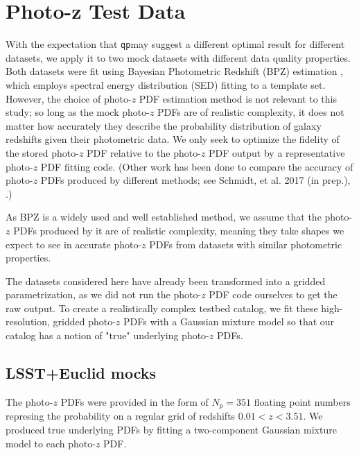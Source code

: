 \documentclass[\docopts]{\docclass}
\newcommand{\qp}{\texttt{qp}}
\begin{document}
\section{Photo-z Test Data}
\label{sec:data}

With the expectation that \qp may suggest a different optimal result for 
different datasets, we apply it to two mock datasets with different data 
quality properties.  Both datasets were fit using Bayesian Photometric Redshift 
(BPZ) estimation \citep{benitez_bayesian_2000}, which employs spectral energy 
distribution (SED) fitting to a template set.  However, the choice of photo-$z$ 
PDF estimation method is not relevant to this study; so long as the mock 
photo-$z$ PDFs are of realistic complexity, it does not matter how accurately 
they describe the probability distribution of galaxy redshifts given their 
photometric data.  We only seek to optimize the fidelity of the stored 
photo-$z$ PDF relative to the photo-$z$ PDF output by a representative 
photo-$z$ PDF fitting code.  (Other work has been done to compare the accuracy 
of photo-$z$ PDFs produced by different methods; see Schmidt, et al. 2017 (in 
prep.), \citet{tanaka_photometric_2017}.)

As BPZ is a widely used and well established method, we assume that the 
photo-$z$ PDFs produced by it are of realistic complexity, meaning they take 
shapes we expect to see in accurate photo-$z$ PDFs from datasets with similar 
photometric properties.

The datasets considered here have already been transformed into a gridded 
parametrization, as we did not run the photo-$z$ PDF code ourselves to get the 
raw output.  To create a realistically complex testbed catalog, we fit these 
high-resolution, gridded photo-$z$ PDFs with a Gaussian mixture model so that 
our catalog has a notion of "true" underlying photo-$z$ PDFs.

\subsection{LSST+Euclid mocks}
\label{sec:mg}


The photo-$z$ PDFs were provided in the form of $N_{p}=351$ floating point 
numbers represing the probability on a regular grid of redshifts $0.01 < z < 
3.51$.  We produced true underlying PDFs by fitting a two-component Gaussian 
mixture model to each photo-$z$ PDF.
\end{document}
